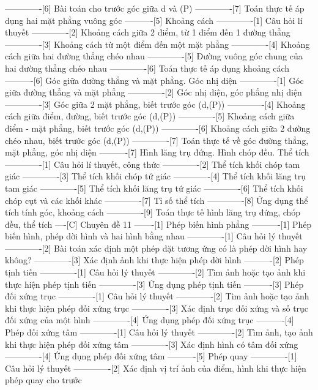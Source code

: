 -------------[6] Bài toán cho trước góc giữa d và (P)
-------------[7] Toán thực tế áp dụng hai mặt phẳng vuông góc
----------[5] Khoảng cách
-------------[1] Câu hỏi lí thuyết
-------------[2] Khoảng cách giữa 2 điểm, từ 1 điểm đến 1 đường thẳng
-------------[3] Khoảng cách từ một điểm đến một mặt phẳng
-------------[4] Khoảng cách giữa hai đường thẳng chéo nhau
-------------[5] Đường vuông góc chung của hai đường thẳng chéo nhau
-------------[6] Toán thực tế áp dụng khoảng cách
----------[6] Góc giữa đường thẳng và mặt phẳng. Góc nhị diện
-------------[1] Góc giữa đường thẳng và mặt phẳng
-------------[2] Góc nhị diện, góc phẳng nhị diện
-------------[3] Góc giữa 2 mặt phẳng, biết trước góc (d,(P))
-------------[4] Khoảng cách giữa điểm, đường, biết trước góc (d,(P))
-------------[5] Khoảng cách giữa điểm - mặt phẳng, biết trước góc (d,(P))
-------------[6] Khoảng cách giữa 2 đường chéo nhau, biết trước góc (d,(P))
-------------[7] Toán thực tế về góc đường thẳng, mặt phẳng, góc nhị diện
----------[7] Hình lăng trụ đứng. Hình chóp đều. Thể tích
-------------[1] Câu hỏi lí thuyết, công thức
-------------[2] Thể tích khối chóp tam giác
-------------[3] Thể tích khối chóp tứ giác
-------------[4] Thể tích khối lăng trụ tam giác
-------------[5] Thể tích khối lăng trụ tứ giác
-------------[6] Thể tích khối chóp cụt và các khối khác
-------------[7] Tỉ số thể tích
-------------[8] Ứng dụng thể tích tính góc, khoảng cách
-------------[9] Toán thực tế hình lăng trụ đứng, chóp đều, thể tích
----[C] Chuyên đề 11
-------[1] Phép biến hình phẳng
----------[1] Phép biến hình, phép dời hình và hai hình bằng nhau
-------------[1] Câu hỏi lý thuyết
-------------[2] Bài toán xác định một phép đặt tương ứng có là phép dời hình hay không?
-------------[3] Xác định ảnh khi thực hiện phép dời hình
----------[2] Phép tịnh tiến
-------------[1] Câu hỏi lý thuyết
-------------[2] Tìm ảnh hoặc tạo ảnh khi thực hiện phép tịnh tiến
-------------[3] Ứng dụng phép tịnh tiến
----------[3] Phép đối xứng trục
-------------[1] Câu hỏi lý thuyết
-------------[2] Tìm ảnh hoặc tạo ảnh khi thực hiện phép đối xứng trục
-------------[3] Xác định trục đối xứng và số trục đối xứng của một hình
-------------[4] Ứng dụng phép đối xứng trục
----------[4] Phép đối xứng tâm
-------------[1] Câu hỏi lý thuyết
-------------[2] Tìm ảnh, tạo ảnh khi thực hiện phép đối xứng tâm
-------------[3] Xác định hình có tâm đối xứng
-------------[4] Ứng dụng phép đối xứng tâm
----------[5] Phép quay
-------------[1] Câu hỏi lý thuyết
-------------[2] Xác định vị trí ảnh của điểm, hình khi thực hiện phép quay cho trước
